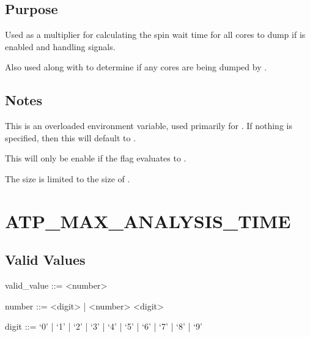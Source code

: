 \documentclass[letterpaper,10pt,english]{sphinxmanual}
\begin{document}
\subsection{Purpose}
\label{\detokenize{flag/flag:id46}}
\sphinxAtStartPar
Used as a multiplier for calculating the spin wait time for all cores to dump if  is enabled and handling signals.

\sphinxAtStartPar
Also used along with {\hyperref[\detokenize{flag/flag:atp-enabled}]{}} to determine if any cores are being dumped by .


\subsection{Notes}
\label{\detokenize{flag/flag:id47}}
\sphinxAtStartPar
This is an overloaded environment variable, used primarily for . If nothing is specified, then this will default to .

\sphinxAtStartPar
This will only be enable if the {\hyperref[\detokenize{flag/flag:atp-enabled}]{}} flag evaluates to .

\sphinxAtStartPar
The size is limited to the size of .


\section{ATP\_MAX\_ANALYSIS\_TIME}
\label{\detokenize{flag/flag:atp-max-analysis-time}}\label{\detokenize{flag/flag:id49}}

\subsection{Valid Values}
\label{\detokenize{flag/flag:id50}}
\begin{DUlineblock}{0em}
\item[] valid\_value ::= \textless{}number\textgreater{}
\item[] number ::= \textless{}digit\textgreater{} | \textless{}number\textgreater{} \textless{}digit\textgreater{}
\item[] digit ::= ‘0’ | ‘1’ | ‘2’ | ‘3’ | ‘4’ | ‘5’ | ‘6’ | ‘7’ | ‘8’ | ‘9’
\end{DUlineblock}
\end{document}
